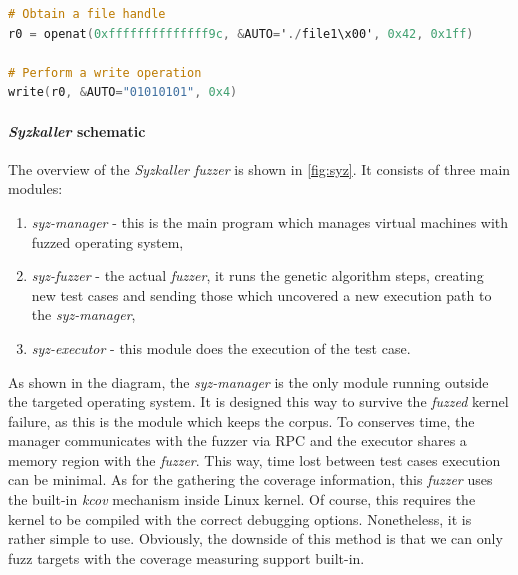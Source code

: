\begin{minipage}\linewidth
    \begin{lstlisting}[language=C,caption={\textit{Syzkaller} DSL describing syscalls \cite{syzkaller_repo}.},captionpos=b,label={syzkaller_dsl}]
# Obtain a file handle
r0 = openat(0xffffffffffffff9c, &AUTO='./file1\x00', 0x42, 0x1ff)

# Perform a write operation
write(r0, &AUTO="01010101", 0x4)
    \end{lstlisting} 
\end{minipage}

\paragraph{\textit{Syzkaller} schematic}

The overview of the \textit{Syzkaller fuzzer} is shown in \ref{fig:syz}. It consists of three main modules:
\begin{enumerate}
    \item \textit{syz-manager} - this is the main program which manages virtual machines with fuzzed operating system,
    \item \textit{syz-fuzzer} - the actual \textit{fuzzer}, it runs the genetic algorithm steps, creating new test cases and sending those which uncovered a new execution path to the \textit{syz-manager},
    \item \textit{syz-executor} - this module does the execution of the test case.
\end{enumerate}
As shown in the diagram, the \textit{syz-manager} is the only module running outside the targeted operating system. It is designed this way to survive the \textit{fuzzed} kernel failure, as this is the module which keeps the corpus. To conserves time, the manager communicates with the fuzzer via RPC and the executor shares a memory region with the \textit{fuzzer}. This way, time lost between test cases execution can be minimal. As for the gathering the coverage information, this \textit{fuzzer} uses the built-in \textit{kcov} mechanism inside Linux kernel. Of course, this requires the kernel to be compiled with the correct debugging options. Nonetheless, it is rather simple to use. Obviously, the downside of this method is that we can only fuzz targets with the coverage measuring support built-in.

